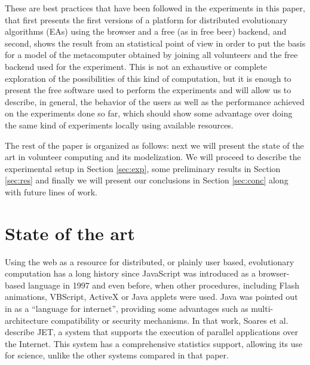 \documentclass{sig-alternate}
\begin{document}
These are best practices that have been followed in the experiments in
this paper, that first presents the first versions of a platform for
distributed evolutionary algorithms (EAs) using the browser and a free (as
in free beer) backend, and second, shows the result from an
statistical point of view in order to put the basis for a model of the
metacomputer obtained by joining all volunteers and the free backend
used for the experiment. This is not an exhaustive or complete
exploration of the possibilities of this kind of computation, but it
is enough to present the free software used to perform the experiments
and will allow us to describe, in general, the behavior of the users
as well as the performance achieved on the experiments done so far,
which should show some advantage over doing the same kind of
experiments locally using available resources. 

The rest of the paper is organized as follows: next we will present
the state of the art in volunteer computing and its modelization. We 
will proceed to describe the experimental setup in Section
\ref{sec:exp}, some preliminary results in Section \ref{sec:res} and
finally we will present our conclusions in Section \ref{sec:conc}
along with future lines of work. 

\section{State of the art}
\label{sec:soa}

Using the web as a resource for distributed, or plainly user based,
evolutionary computation has a long history since JavaScript was
introduced as a browser-based language in 1997 and even before, when
other procedures, including Flash animations, VBScript, ActiveX or Java applets were
used. Java was pointed out in \cite{soares1998get} as a ``language for
internet'', providing some advantages such as multi-architecture compatibility or 
security mechanisms.
In that work, Soares et al. describe JET, a system that supports
the execution of parallel applications over the Internet. This system has 
a comprehensive statistics support, allowing its use for science, 
unlike the other systems compared in that paper.
\end{document}
